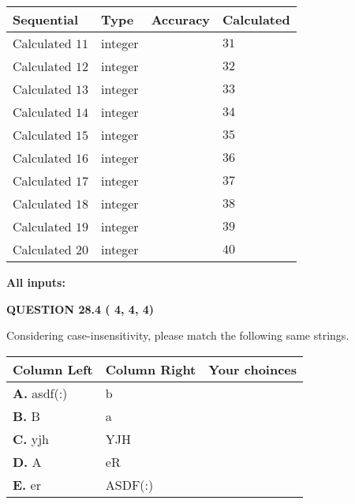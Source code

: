 \documentclass[12pt]{article}
\begin{document}
  
\noindent\begin{tabular}{|l|l|l|l|}
\hline
 Sequential & Type & Accuracy & Calculated \\ 
\hline
 
 
  Calculated $          11$ & integer &  & 
  $ 31 $ 
 \\  \hline  
 
 
  Calculated $          12$ & integer &  & 
  $ 32 $ 
 \\  \hline  
 
 
  Calculated $          13$ & integer &  & 
  $ 33 $ 
 \\  \hline  
 
 
  Calculated $          14$ & integer &  & 
  $ 34 $ 
 \\  \hline  
 
 
  Calculated $          15$ & integer &  & 
  $ 35 $ 
 \\  \hline  
 
 
  Calculated $          16$ & integer &  & 
  $ 36 $ 
 \\  \hline  
 
 
  Calculated $          17$ & integer &  & 
  $ 37 $ 
 \\  \hline  
 
 
  Calculated $          18$ & integer &  & 
  $ 38 $ 
 \\  \hline  
 
 
  Calculated $          19$ & integer &  & 
  $ 39 $ 
 \\  \hline  
 
 
  Calculated $          20$ & integer &  & 
  $ 40 $ 
 \\  \hline  
 \end{tabular}
   
   
   
   
\noindent\vspace{0.1in}\hspace{-0.08in} {\textbf{\Large{All inputs: }}}
   
   
  
\vspace{0.2in}
  
{\textbf{\Large{QUESTION
28.4 
 (          4,          4,          4)
}}}
  
  
Considering case-insensitivity, please match the following same strings.
  
  
\begin{tabular}{|l|l|l|}
 \hline
 Column Left & Column Right  & Your choinces \\ 
 \hline
{\textbf{\large{
A.}}}
asdf(:)
  & 
b
 & 
 \\ 
 \hline
{\textbf{\large{
B.}}}
B
  & 
a
 & 
 \\ 
 \hline
{\textbf{\large{
C.}}}
yjh
  & 
YJH
 & 
 \\ 
 \hline
{\textbf{\large{
D.}}}
A
  & 
eR
 & 
 \\ 
 \hline
{\textbf{\large{
E.}}}
er
  & 
ASDF(:)
 & 
 \\ 
 \hline
 \end{tabular}
  
\end{document}

